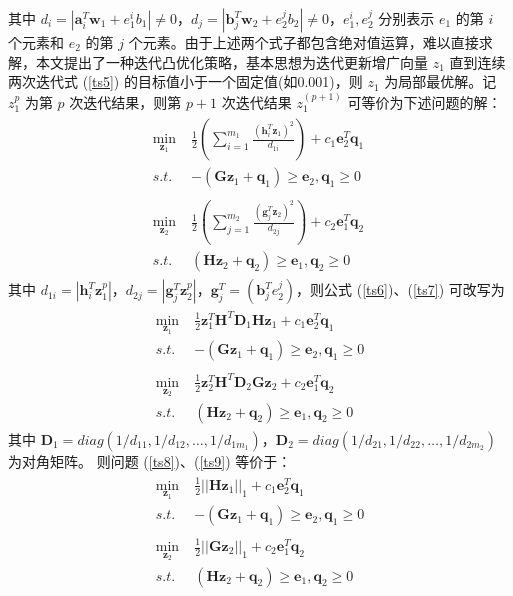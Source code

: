其中 $d_i=|\mathbf{a}_i^T\mathbf{w}_1+e_1^ib_1|\ne 0$，$d_j=|\mathbf{b}_j^T\mathbf{w}_2+e_2^jb_2|\ne 0$，$e_1^i,e_2^j$ 分别表示 $e_1$ 的第 $i$ 个元素和 $e_2$ 的第 $j$ 个元素。由于上述两个式子都包含绝对值运算，难以直接求解，本文提出了一种迭代凸优化策略，基本思想为迭代更新增广向量 $z_1$ 直到连续两次迭代式 (\ref{ts5}) 的目标值小于一个固定值(如0.001)，则 $z_1$ 为局部最优解。记 $z_1^p$ 为第 $p$ 次迭代结果，则第 $p+1$ 次迭代结果 $z_1^{(p+1)}$ 可等价为下述问题的解：
\begin{align}
\begin{split}
\label{ts6}
	\min\limits_{\mathbf{z}_1} \;& \frac{1}{2}(\sum_{i=1}^{m_1}\frac{(\mathbf{h}_i^T\mathbf{z}_1)^2}{d_{1i}})+c_1\mathbf{e}_2^T\mathbf{q}_1 \ \\
	s.t.\;& -(\mathbf{Gz}_1+\mathbf{q}_1) \geq \mathbf{e}_2,\mathbf{q}_1\geq 0
\end{split}
\\
\begin{split}
\label{ts7}
	\min\limits_{\mathbf{z}_2} \;& \frac{1}{2}(\sum_{j=1}^{m_2}\frac{(\mathbf{g}_j^T\mathbf{z}_2)^2}{d_{2j}})+c_2\mathbf{e}_1^T\mathbf{q}_2  \\
	s.t. \;& (\mathbf{Hz}_2+\mathbf{q}_2)\geq \mathbf{e}_1, \mathbf{q}_2\geq 0
\end{split}	
\end{align}
其中 $d_{1i}=|\mathbf{h}_i^T\mathbf{z}_1^p|$，$d_{2j}=|\mathbf{g}_j^T\mathbf{z}_2^p|$，$\mathbf{g}_j^T=(\mathbf{b}_j^Te_2^j)$，则公式 (\ref{ts6})、(\ref{ts7}) 可改写为
\begin{align}
\begin{split}
\label{ts8}
	\min\limits_{\mathbf{z}_1} \;& \frac{1}{2}\mathbf{z}_1^T\mathbf{H}^T\mathbf{D}_1\mathbf{Hz}_1+c_1\mathbf{e}_2^T\mathbf{q}_1 \\
	s.t.\;& -(\mathbf{Gz}_1+\mathbf{q}_1) \geq \mathbf{e}_2,\mathbf{q}_1\geq 0
\end{split}
\\
\begin{split}
\label{ts9}
	\min\limits_{\mathbf{z}_2} \;& \frac{1}{2}\mathbf{z}_2^T\mathbf{H}^T\mathbf{D}_2\mathbf{Gz}_2+c_2\mathbf{e}_1^T\mathbf{q}_2 \\
	s.t. \;& (\mathbf{Hz}_2+\mathbf{q}_2)\geq \mathbf{e}_1, \mathbf{q}_2\geq 0
\end{split}
\end{align}
其中 $\mathbf{D}_1=diag(1/d_{11},1/d_{12},…,1/d_{1m_1})，\mathbf{D}_2=diag(1/d_{21},1/d_{22},…,1/d_{2m_2})$ 为对角矩阵。
则问题 (\ref{ts8})、(\ref{ts9}) 等价于：
\begin{align}
\begin{split}
	\min\limits_{\mathbf{z}_1} \;& \frac{1}{2}||\mathbf{Hz}_1||_1+c_1\mathbf{e}_2^T\mathbf{q}_1 \\
	s.t.\;& -(\mathbf{Gz}_1+\mathbf{q}_1) \geq \mathbf{e}_2,\mathbf{q}_1\geq 0
\end{split}
\\
\begin{split}
	\min\limits_{\mathbf{z}_2} \;& \frac{1}{2}||\mathbf{Gz}_2||_1+c_2\mathbf{e}_1^T\mathbf{q}_2 \\
	s.t. \;& (\mathbf{Hz}_2+\mathbf{q}_2)\geq \mathbf{e}_1, \mathbf{q}_2\geq 0
\end{split}
\end{align}
